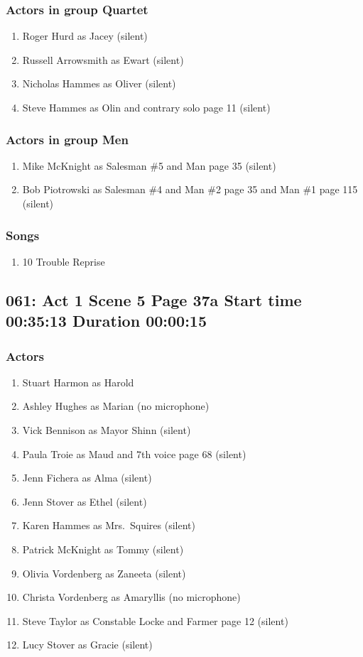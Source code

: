 \subsubsection{Actors in group Quartet}
\begin{enumerate}
\item Roger Hurd as Jacey (silent)
\item Russell Arrowsmith as Ewart (silent)
\item Nicholas Hammes as Oliver (silent)
\item Steve Hammes as Olin and contrary solo page 11 (silent)
\end{enumerate}
\subsubsection{Actors in group Men}
\begin{enumerate}
\item Mike McKnight as Salesman \#5 and Man page 35 (silent)
\item Bob Piotrowski as Salesman \#4 and Man \#2 page 35 and Man \#1 page 115 (silent)
\end{enumerate}

\subsubsection{Songs}
\begin{enumerate}
\item 10 Trouble Reprise
\end{enumerate}
\subsection{061: Act 1 Scene 5 Page 37a Start time 00:35:13 Duration 00:00:15}

\subsubsection{Actors}
\begin{enumerate}
\item Stuart Harmon as Harold
\item Ashley Hughes as Marian (no microphone)
\item Vick Bennison as Mayor Shinn (silent)
\item Paula Troie as Maud and 7th voice page 68 (silent)
\item Jenn Fichera as Alma (silent)
\item Jenn Stover as Ethel (silent)
\item Karen Hammes as Mrs.~Squires (silent)
\item Patrick McKnight as Tommy (silent)
\item Olivia Vordenberg as Zaneeta (silent)
\item Christa Vordenberg as Amaryllis (no microphone)
\item Steve Taylor as Constable Locke and Farmer page 12 (silent)
\item Lucy Stover as Gracie (silent)
\end{enumerate}
